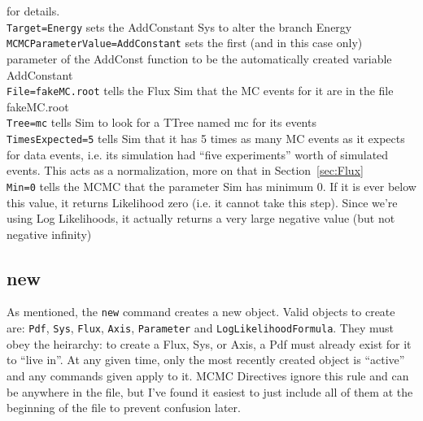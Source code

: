 for details.\medskip\\
\verb|Target=Energy| sets the AddConstant Sys to alter the branch
Energy\medskip\\
\verb|MCMCParameterValue=AddConstant| sets the first (and in this case
only) parameter of the AddConst function to be the automatically
created variable AddConstant\medskip\\
\verb|File=fakeMC.root| tells the Flux Sim that the MC events for it
are in the file fakeMC.root\medskip\\
\verb|Tree=mc| tells Sim to look for a TTree named mc for its events\medskip\\
\verb|TimesExpected=5| tells Sim that it has 5 times as many MC events
as it expects for data events, i.e. its simulation had ``five
experiments'' worth of simulated events.  This acts as a
normalization, more on that in \mbox{Section \ref{sec:Flux}}\medskip\\
\verb|Min=0| tells the MCMC that the parameter Sim has minimum 0.  If
it is ever below this value, it returns Likelihood zero (i.e. it
cannot take this step).  Since we're using Log Likelihoods, it
actually returns a very large negative value (but not negative infinity)

\subsection{new}
As mentioned, the \verb|new| command creates a new object.  Valid
objects to create are: {\tt Pdf}, {\tt Sys}, {\tt Flux},
{\tt Axis}, {\tt Parameter} and {\tt LogLikelihoodFormula}.  They must
obey the heirarchy: to create a Flux, Sys, or Axis, a Pdf must
already exist for it to ``live in''.  At any given time, only the most
recently created object is ``active'' and any commands given apply to
it.  MCMC Directives ignore this rule and can be anywhere in the file,
but I've found it easiest to just include all of them at the beginning
of the file to prevent confusion later.

